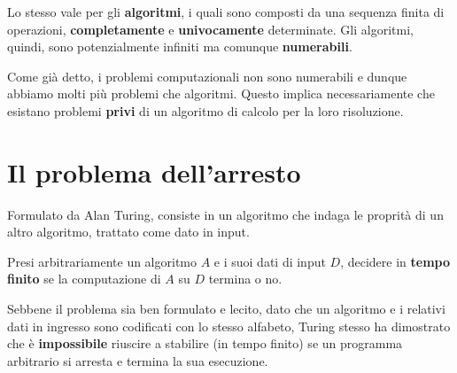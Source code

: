 Lo stesso vale per gli \textbf{algoritmi}, i quali sono composti da una sequenza finita di operazioni,
\textbf{completamente} e \textbf{univocamente} determinate. Gli algoritmi, quindi, sono potenzialmente infiniti ma
comunque \textbf{numerabili}.

Come gi\`a detto, i problemi computazionali non sono numerabili e dunque abbiamo molti pi\`u problemi che algoritmi.
Questo implica necessariamente che esistano problemi \textbf{privi} di un algoritmo di calcolo per la loro risoluzione.

\section{Il problema dell'arresto}\label{arresto}
Formulato da Alan Turing, consiste in un algoritmo che indaga le proprit\`a di un altro algoritmo, trattato come dato
in input.

\begin{center}
	Presi arbitrariamente un algoritmo $A$ e i suoi dati di input $D$, decidere in \textbf{tempo finito} se la computazione
	di $A$ su $D$ termina o no.
\end{center}
Sebbene il problema sia ben formulato e lecito, dato che un algoritmo e i relativi dati in ingresso sono codificati con
lo stesso alfabeto, Turing stesso ha dimostrato che \`e \textbf{impossibile} riuscire a stabilire (in tempo finito) se
un programma arbitrario si arresta e termina la sua esecuzione.

